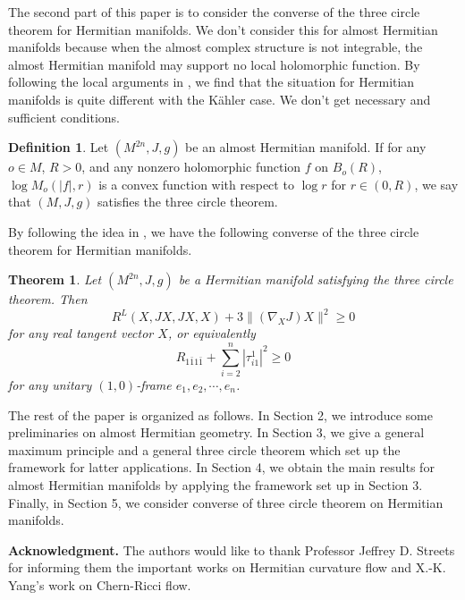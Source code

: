 \documentclass[12pt]{amsart}
\newtheorem{thm}{Theorem}[section]
\theoremstyle{definition}
\newtheorem{defn}{Definition}[section]
\theoremstyle{remark}
\numberwithin{equation}{section}
\begin{document}
The second part of this paper is to consider the converse of the three circle theorem for Hermitian manifolds. We don't consider this for almost Hermitian manifolds because when the almost complex structure is not integrable, the almost Hermitian manifold may support no local holomorphic function. By following the local arguments in \cite{Liu}, we find that the situation for Hermitian manifolds is quite different with the K\"ahler case. We don't get necessary and sufficient conditions.
\begin{defn}
Let $(M^{2n},J,g)$ be an almost Hermitian manifold. If for any $o\in M$, $R>0$, and any nonzero holomorphic function $f$ on $B_o(R)$, $\log M_o(|f|,r)$ is a convex function with respect to $\log r$ for $r\in (0,R)$, we say that $(M,J,g)$ satisfies the three circle theorem.
\end{defn}
By following the idea in \cite{Liu}, we have the following converse of the three circle theorem for Hermitian manifolds.
\begin{thm}\label{thm-con-1-holo}
Let $(M^{2n},J,g)$ be a Hermitian manifold satisfying the three circle theorem. Then
$$R^L(X,JX,JX,X)+3\|(\nabla_XJ)X\|^2\geq 0$$
for any real tangent vector $X$, or equivalently
$$R_{1\bar 11\bar 1}+\sum_{i=2}^n|\tau_{i1}^1|^2\geq 0$$
for any unitary $(1,0)$-frame $e_1,e_2,\cdots,e_n$.
\end{thm}

The rest of the paper is organized as follows. In Section 2, we introduce some preliminaries on almost Hermitian geometry. In Section 3, we give a general maximum principle and a general three circle theorem which set up the framework for latter applications. In Section 4, we obtain the main results for almost Hermitian manifolds by applying the framework set up in Section 3. Finally, in Section 5, we consider converse of three circle theorem on Hermitian manifolds.


{\bf Acknowledgment.} The authors would like to thank Professor Jeffrey D. Streets for informing them the important works \cite{ST,Us1,Us2} on Hermitian curvature flow and X.-K. Yang's work \cite{Yang} on Chern-Ricci flow.
\end{document}
